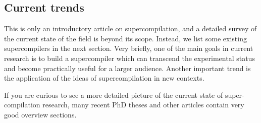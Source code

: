 \subsection{Current trends}

This is only an introductory article on supercompilation, and 
a detailed survey of the current state of the field is
beyond its scope.
Instead, we list some existing supercompilers in the next section.
Very briefly, one of the main goals in current research is to build a
supercompiler which can transcend the experimental status
and become practically useful for a larger audience.
Another important trend is the application of the ideas of supercompilation
in new contexts.

If you are curious to see a more detailed picture of the current
state of super-compilation research, many recent PhD theses and other articles
\cite{Sorensen1994TurchinSupercompiler,Secher1999Perfect,Secher2002DrivingBased,Mitchell2008taa,Nemytykh2008PhD,Jonsson2008Supercompilation,Klyuchnikov2010Phd,Jonsson2011Phd,Bolingbroke2013Phd}
contain very good overview sections.
